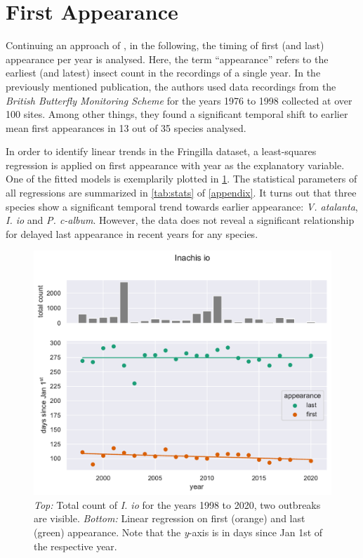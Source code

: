 \section{First Appearance}

Continuing an approach of \textcite{roy2000}, in the following, the timing of first (and last) appearance per year is analysed. Here, the term \enquote{appearance} refers to the earliest (and latest) insect count in the recordings of a single year. In the previously mentioned publication, the authors used data recordings from the \textit{British Butterfly Monitoring Scheme} for the years 1976 to 1998 collected at over 100 sites. Among other things, they found a significant temporal shift to earlier mean first appearances in 13 out of 35 species analysed. 

In order to identify linear trends in the Fringilla dataset, a least-squares regression is applied on first appearance with year as the explanatory variable. One of the fitted models is exemplarily plotted in \cref{fig:io-linregress}. The statistical parameters of all regressions are summarized in \cref{tab:stats} of \cref{appendix}. It turns out that three species show a significant temporal trend towards earlier appearance: \textit{V. atalanta}, \textit{I. io} and \textit{P. c-album}. However, the data does not reveal a significant relationship for delayed last appearance in recent years for any species.

\begin{figure}
	\centering
	\includegraphics[width=0.9\linewidth]{"figs/Inachis io_linregress"}
	\caption{\textit{Top:} Total count of \textit{I. io} for the years 1998 to 2020, two outbreaks are visible. \textit{Bottom:} Linear regression on first (orange) and last (green) appearance. Note that the \textit{y}-axis is in days since Jan 1st of the respective year.}
	\label{fig:io-linregress}
\end{figure}


